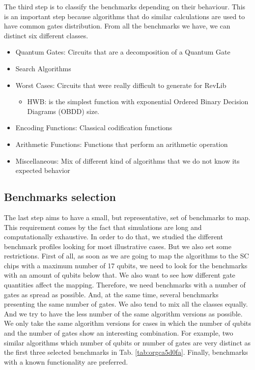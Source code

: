 The third step is to classify the benchmarks depending on their behaviour.
This is an important step because algorithms that do similar calculations are used to have common gates distribution.
From all the benchmarks we have, we can distinct six different classes.

\begin{itemize}
\item Quantum Gates: Circuits that are a decomposition of a Quantum Gate
\item Search Algorithms
\item Worst Cases: Circuits that were really difficult to generate for RevLib
\begin{itemize}
\item HWB: is the simplest function with exponential Ordered Binary Decision Diagrams (OBDD) size.
\end{itemize}
\item Encoding Functions: Classical codification functions
\item Arithmetic Functions: Functions that perform an arithmetic operation
\item Miscellaneous: Mix of different kind of algorithms that we do not know its expected behavior
\end{itemize}


\subsection*{Benchmarks selection}
\label{sec:org155eb6a}

The last step aims to have a small, but representative, set of benchmarks to map.
This requirement comes by the fact that simulations are long and computationally exhaustive.
In order to do that, we studied the different benchmark profiles looking for most illustrative cases.
But we also set some restrictions.
First of all, as soon as we are going to map the algorithms to the SC chips with a maximum number of 17 qubits, we need to look for the benchmarks with an amount of qubits below that.
We also want to see how different gate quantities affect the mapping.
Therefore, we need benchmarks with a number of gates as spread as possible.
And, at the same time, several benchmarks presenting the same number of gates.
We also tend to mix all the classes equally.
And we try to have the less number of the same algorithm versions as possible.
We only take the same algorithm versions for cases in which the number of qubits and the number of gates show an interesting combination.
For example, two similar algorithms which number of qubits or number of gates are very distinct as the first three selected benchmarks in Tab. \ref{tab:orgca5d0fa}.
Finally, benchmarks with a known functionality are preferred.

